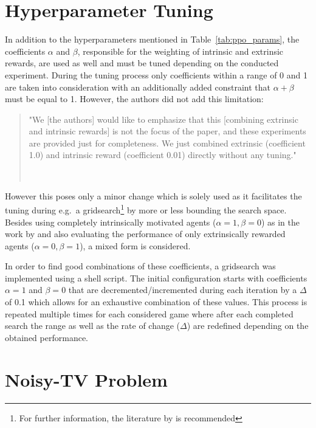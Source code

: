 \documentclass[draft,final]{vutinfth} %
\newcommand{\p}[1]{see p. #1}
\begin{document}
    \section{Hyperparameter Tuning}\label{sec:hyperparameter-tuning}

    In addition to the hyperparameters mentioned in Table~\ref{tab:ppo_params}, the coefficients $\alpha$ and $\beta$, responsible for the weighting of intrinsic and extrinsic rewards, are used as well and must be tuned depending on the conducted experiment.
    During the tuning process only coefficients within a range of 0 and 1 are taken into consideration with an additionally added constraint that $\alpha + \beta$ must be equal to 1.
    However, the authors did not add this limitation:

    \begin{quote}
        "We [the authors] would like to emphasize that this [combining extrinsic and intrinsic rewards] is not the focus of the paper, and these experiments are provided just for completeness.
        We just combined extrinsic (coefficient 1.0) and intrinsic reward (coefficient 0.01) directly without any tuning."

        \hfill~\cite[\p{9}]{burda_large-scale_2018-1}
    \end{quote}

    However this poses only a minor change which is solely used as it facilitates the tuning during e.g.\ a gridsearch\footnote{For further information, the literature by \citet[\p{420ff}]{goodfellow_deep_2016} is recommended} by more or less bounding the search space.
    Besides using completely intrinsically motivated agents ($\alpha=1,\beta=0$) as in the work by \citet{burda_large-scale_2018-1} and also evaluating the performance of only extrinsically rewarded agents ($\alpha=0,\beta=1$), a mixed form is considered.

    In order to find good combinations of these coefficients, a gridsearch was implemented using a shell script.
    The initial configuration starts with coefficients $\alpha=1$ and $\beta=0$ that are decremented/incremented during each iteration by a $\Delta$ of 0.1 which allows for an exhaustive combination of these values.
    This process is repeated multiple times for each considered game where after each completed search the range as well as the rate of change ($\Delta$) are redefined depending on the obtained performance.


    \section{Noisy-TV Problem}\label{sec:noisy-tv-problem}
\end{document}
